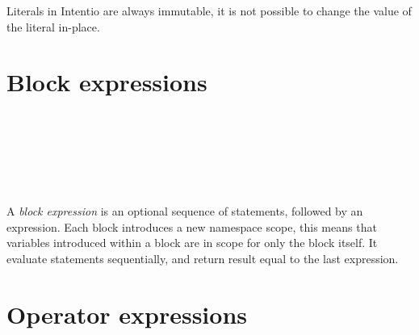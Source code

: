 Literals in Intentio are always immutable, it is not possible to change the value of the literal in-place.

\section{Block expressions}

\begin{bnf}
   \eq {} \\
  \\
   \eq \term{\{} \  \ \term{\}} \\
  \\
   \eq {} \  \ \gtry{\term{;}}
\end{bnf}

A \emph{block expression} is an optional sequence of statements, followed by an expression. Each block introduces a new namespace scope, this means that variables introduced within a block are in scope for only the block itself. It evaluate statements sequentially, and return result equal to the last expression.



\section{Operator expressions}

